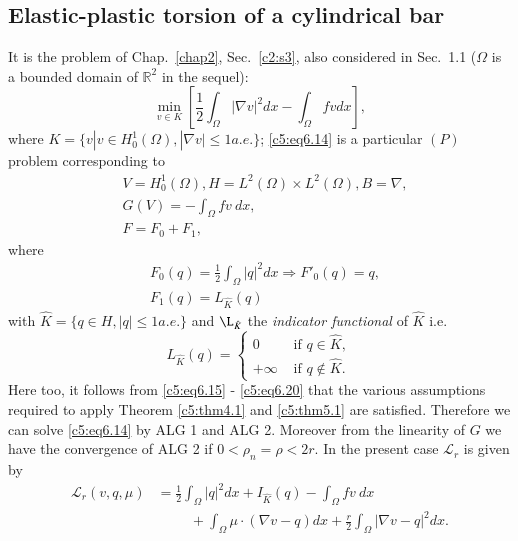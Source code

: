 \subsection{Elastic-plastic torsion of a cylindrical 
bar}\label{c5:ss6.2}%

It is the problem of Chap.~\ref{chap2},  Sec.~\ref{c2:s3},  also considered in 
Sec.~1.1 ($\Omega$ is a bounded domain of $\mathbb{R}^2$ in the sequel):
\begin{equation}
\min _{v \in K}[\frac{1}{2} \int_\Omega | \nabla v |^2 dx - 
\int_\Omega fv dx ],  \tag{6.14}\label{c5:eq6.14} 
\end{equation}
where \qquad $K= \{ v | v \in H^1_0 (\Omega ), | \nabla v| \leq 1a. e. \}$;
\eqref{c5:eq6.14} is a particular $(P)$ problem corresponding to 
\begin{align*}
&V = H^1_0 (\Omega ) ,  H = L^2 (\Omega ) \times L^2 (\Omega ), B = 
\nabla, \tag{6.15}\label{c5:eq6.15}\\ 
&G (V) = - \int_\Omega fv ~ dx, \tag{6.16}\label{c5:eq6.16}\\
&F = F_0 + F_1,  \tag{6.17}\label{c5:eq6.17}
\end{align*}
where 
\begin{align*}
&F_0 (q) = \frac{1}{2}\int_\Omega | q |^2 dx \Rightarrow F'_0 (q) = q, \tag{6.18}\label{c5:eq6.18}\\
&F_1 (q) = L_{\hat{K}} (q) \tag{6.19}\label{c5:eq6.19}
\end{align*}
with $\hat{K} = \{q \in H,  | q | \leq 1 a. e. \}$ and $\L_{\hat{K}}$ the  \textit{indicator functional} of $\hat{K}$ i.e.  
\begin{equation}
L_{\hat{K}} (q) = 
\begin{cases}
0 &\text{ if } q \in \hat{K}, \\
+ \infty &\text{ if } q \notin\hat{K}. \tag{6.20}\label{c5:eq6.20}
 \end{cases} 
 \end{equation}
 Here too, it follows from \eqref{c5:eq6.15} - \eqref{c5:eq6.20} that 
 the various assumptions required to apply Theorem \ref{c5:thm4.1} and 
 \ref{c5:thm5.1} are satisfied.  Therefore we can solve 
 \eqref{c5:eq6.14} by ALG 1  and  ALG 2.  Moreover from the linearity 
 of $G$ we have the convergence of ALG 2 if $0 < \rho_n = \rho < 2r$. 
 In the present case $\mathscr{L}_r$ is given by    
 \begin{align*}
\mathscr{L}_r (v, q, \mu ) &= \frac{1}{2} \int_\Omega | q |^2 dx + 
I_{\hat{K}} (q) - \int_\Omega fv ~ dx\\ 
&\hspace{1cm}+ \int_\Omega \mu \cdot 
(\nabla v-q) dx + \frac{r}{2} \int_\Omega | \nabla v-q 
|^2 dx.  \tag{6.21}\label{c5:eq6.21}   
 \end{align*}\pageoriginale   
 
